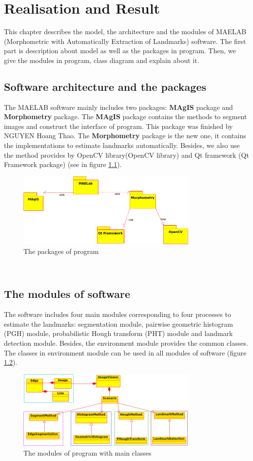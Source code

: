 \chapter{Realisation and Result}
This chapter describes the model, the architecture and the modules of MAELAB (Morphometric with Automatically Extraction of Landmarks) software. The first part is description about model as well as the packages in program. Then, we give the modules in program, class diagram and explain about it.
\section{Software architecture and the packages}
The MAELAB software mainly includes two packages: \textbf{MAgIS} package and \textbf{Morphometry} package. The \textbf{MAgIS} package contains the methods to segment images and construct the interface of program. This package was finished by NGUYEN Hoang Thao. The \textbf{Morphometry} package is the new one, it contains the implementations to estimate landmarks automatically. Besides, we also use the method provides by OpenCV library(OpenCV library) and Qt framework (Qt Framework package) (see in figure \ref{fig:42}).
\begin{figure}[h!]
\centering
\includegraphics[width=0.8\textwidth]{./images/packages}
\caption{The packages of program}
\label{fig:42}
\end{figure}~\\
\section{The modules of software}
The software includes four main modules corresponding to four processes to estimate the landmarks: segmentation module, pairwise geometric histogram (PGH) module, probabilistic Hough transform (PHT) module and landmark detection module. Besides, the environment module provides the common classes. The classes in environment module can be used in all modules of software (figure \ref{fig:41}).
\begin{figure}[h!]
\centering
\includegraphics[width=0.8\textwidth]{./images/modules}
\caption{The modules of program with main classes}
\label{fig:41}
\end{figure}

